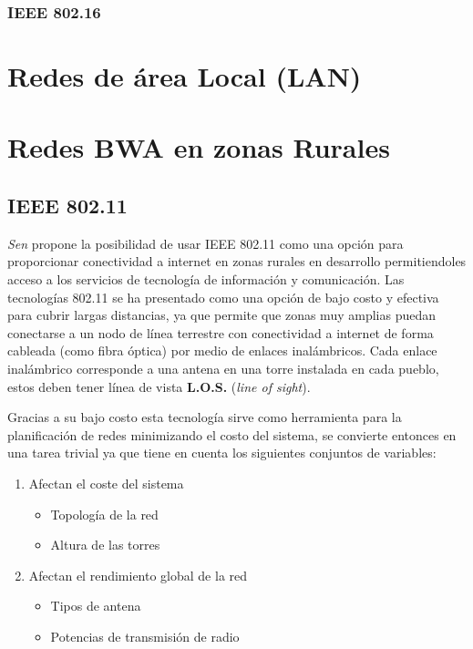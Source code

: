 \documentclass[]{article}
\providecommand{\tightlist}{%
  \setlength{\itemsep}{0pt}\setlength{\parskip}{0pt}}
\begin{document}
\subsubsection{IEEE 802.16}\label{ieee-802.16}

\section{Redes de área Local (LAN)}\label{redes-de-uxe1rea-local-lan}

\section{Redes BWA en zonas Rurales}\label{redes-bwa-en-zonas-rurales}

\subsection{IEEE 802.11}\label{ieee-802.11}

\emph{Sen} propone la posibilidad de usar IEEE 802.11 como una opción
para proporcionar conectividad a internet en zonas rurales en desarrollo
permitiendoles acceso a los servicios de tecnología de información y
comunicación. Las tecnologías 802.11 se ha presentado como una opción de
bajo costo y efectiva para cubrir largas distancias, ya que permite que
zonas muy amplias puedan conectarse a un nodo de línea terrestre con
conectividad a internet de forma cableada (como fibra óptica) por medio
de enlaces inalámbricos. Cada enlace inalámbrico corresponde a una
antena en una torre instalada en cada pueblo, estos deben tener línea de
vista \textbf{L.O.S.} (\emph{line of sight}).

Gracias a su bajo costo esta tecnología sirve como herramienta para la
planificación de redes minimizando el costo del sistema, se convierte
entonces en una tarea trivial ya que tiene en cuenta los siguientes
conjuntos de variables:

\begin{enumerate}
\def\labelenumi{\arabic{enumi}.}
\tightlist
\item
  Afectan el coste del sistema

  \begin{itemize}
  \tightlist
  \item
    Topología de la red
  \item
    Altura de las torres
  \end{itemize}
\item
  Afectan el rendimiento global de la red

  \begin{itemize}
  \tightlist
  \item
    Tipos de antena
  \item
    Potencias de transmisión de radio
  \end{itemize}
\end{enumerate}
\end{document}
